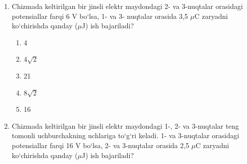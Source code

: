 \begin{enumerate}
    
    \item Chizmada keltirilgan bir jinsli elektr maydondagi 2- va 3-nuqtalar orasidagi potensiallar farqi 6 V bo‘lsa, 1- va 3- nuqtalar orasida 3,5 $\mu$C zaryadni ko‘chirishda qanday ($\mu$J) ish bajariladi?

    
    \begin{enumerate}[label=\Alph*)]
        \item 4
        \item $4\sqrt{2}$
        \item 21
        \item $8\sqrt{2}$
        \item 16
    \end{enumerate}

    \item Chizmada keltirilgan bir jinsli elektr maydondagi 1-, 2- va 3-nuqtalar teng tomonli uchburchakning uchlariga to‘g‘ri keladi. 1- va 3-nuqtalar orasidagi potensiallar farqi 16 V bo‘lsa, 2- va 3-nuqtalar orasida 2,5 $\mu$C zaryadni ko‘chirishda qanday ($\mu$J) ish bajariladi?

\end{enumerate}
